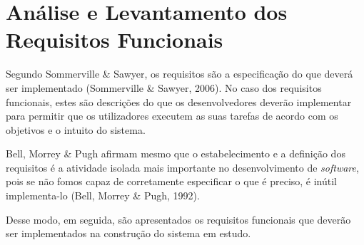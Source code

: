 \documentclass[a4paper,12pt]{report}
\begin{document}
\chapter{Análise e Levantamento dos Requisitos Funcionais}	

	Segundo Sommerville \& Sawyer, os requisitos são a especificação do que deverá ser implementado (Sommerville \& Sawyer, 2006). No caso dos requisitos funcionais, estes são descrições do que os desenvolvedores deverão implementar para permitir que os utilizadores executem as suas tarefas de acordo com os objetivos e o intuito do sistema. 

	Bell, Morrey \& Pugh afirmam mesmo que o estabelecimento e a definição dos requisitos é a atividade isolada mais importante no desenvolvimento de \textit{software}, pois se não fomos capaz de corretamente especificar o que é preciso, é inútil implementa-lo (Bell, Morrey \& Pugh, 1992).
	
	Desse modo, em seguida, são apresentados os requisitos funcionais que deverão ser implementados na construção do sistema em estudo.
	
\end{document}
